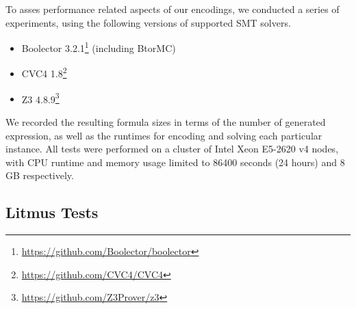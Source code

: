 To asses performance related aspects of our encodings,
we conducted a series of experiments, using the following versions of supported SMT solvers.
%
%
%
%
%
\begin{itemize}
  \item Boolector 3.2.1\footnote{\url{https://github.com/Boolector/boolector}} (including BtorMC)
  \item CVC4 1.8\footnote{\url{https://github.com/CVC4/CVC4}}
  \item Z3 4.8.9\footnote{\url{https://github.com/Z3Prover/z3}}
\end{itemize}
%

We recorded the resulting formula sizes in terms of the number of generated expression, as well as the runtimes for encoding and solving each particular instance.
All tests were performed on a cluster of Intel\textsuperscript{\textregistered} Xeon\textsuperscript{\textregistered} E5-2620 v4 nodes, with CPU runtime and memory usage limited to 86400 seconds (24 hours) and 8 GB respectively.


\subsection*{Litmus Tests}

